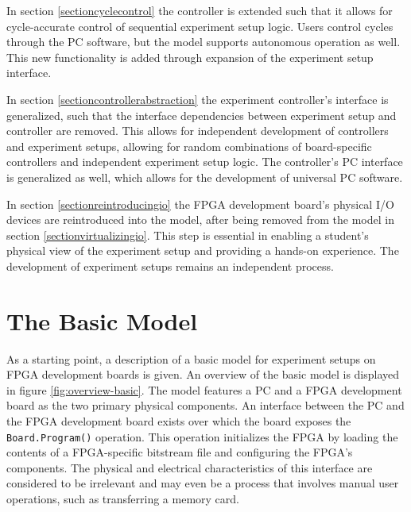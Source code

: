 \documentclass[openright]{template/uva-bachelor-thesis}
\begin{document}
In section \ref{sectioncyclecontrol} the controller is extended such that it allows for cycle-accurate control of sequential experiment setup logic. Users control cycles through the PC software, but the model supports autonomous operation as well. This new functionality is added through expansion of the experiment setup interface.

In section \ref{sectioncontrollerabstraction} the experiment controller's interface is generalized, such that the interface dependencies between experiment setup and controller are removed. This allows for independent development of controllers and experiment setups, allowing for random combinations of board-specific controllers and independent experiment setup logic. The controller's PC interface is generalized as well, which allows for the development of universal PC software.

In section \ref{sectionreintroducingio} the FPGA development board's physical I/O devices are reintroduced into the model, after being removed from the model in section \ref{sectionvirtualizingio}. This step is essential in enabling a student's physical view of the experiment setup and providing a hands-on experience. The development of experiment setups remains an independent process.



\section{The Basic Model}
\label{sectionbasicmodel}



As a starting point, a description of a basic model for experiment setups on FPGA development boards is given. An overview of the basic model is displayed in figure \ref{fig:overview-basic}. The model features a PC and a FPGA development board as the two primary physical components. An interface between the PC and the FPGA development board exists over which the board exposes the \texttt{Board.Program()} operation. This operation initializes the FPGA by loading the contents of a FPGA-specific bitstream file and configuring the FPGA's components. The physical and electrical characteristics of this interface are considered to be irrelevant and may even be a process that involves manual user operations, such as transferring a memory card.
\end{document}
